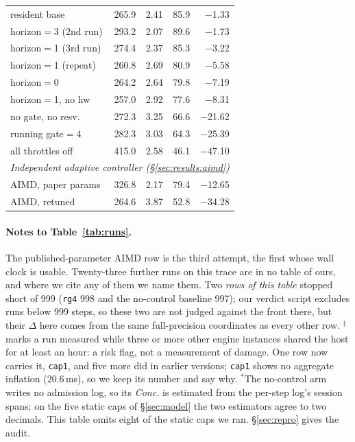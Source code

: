 \begin{table}[tb]
\begin{tabular}{lrrrr}
    resident base     & 265.9 & 2.41 & 85.9 & $-$1.33 \\
    horizon$=$3 (2nd run) & 293.2 & 2.07 & 89.6 & $-$1.73 \\
    horizon$=$1 (3rd run) & 274.4 & 2.37 & 85.3 & $-$3.22 \\
    horizon$=$1 (repeat) & 260.8 & 2.69 & 80.9 & $-$5.58 \\
    horizon$=$0       & 264.2 & 2.64 & 79.8 & $-$7.19 \\
    horizon$=$1, no hw & 257.0 & 2.92 & 77.6 & $-$8.31 \\
    no gate, no resv. & 272.3 & 3.25 & 66.6 & $-$21.62 \\
    running gate$=$4  & 282.3 & 3.03 & 64.3 & $-$25.39 \\
    all throttles off & 415.0 & 2.58 & 46.1 & $-$47.10 \\
    \midrule
    \multicolumn{5}{l}{\emph{Independent adaptive controller (\S\ref{sec:results:aimd})}}\\
    AIMD, paper params & 326.8 & 2.17 & 79.4 & $-$12.65 \\
    AIMD, retuned     & 264.6 & 3.87 & 52.8 & $-$34.28 \\
    \bottomrule
  \end{tabular}
\end{table}


\paragraph{Notes to Table~\ref{tab:runs}.} The published-parameter AIMD row is
the third attempt, the first whose wall clock is usable. Twenty-three further runs
on this trace are in no table of ours, and where we cite any of them we name
them. Two
\emph{rows of this table} stopped short of 999 (\texttt{rg4} 998 and the
no-control baseline 997); our verdict script excludes runs below 999 steps, so
these two are not judged against the front there, but their $\Delta$ here comes
from the same full-precision coordinates as every other row. $^\ddagger$ marks a
run measured while three or more other engine instances shared the host for at
least an hour: a risk flag, not a measurement of damage. One row now carries it,
\texttt{cap1}, and five more did in earlier versions; \texttt{cap1} shows no
aggregate inflation (20.6\,ms), so we keep its number and say why.
$^\ast$The no-control arm writes no admission log, so its
\emph{Conc.} is estimated from the per-step log's session spans; on the five
static caps of \S\ref{sec:model} the two estimators agree to two decimals. This
table omits eight of the static caps we ran. \S\ref{sec:repro} gives the audit.

